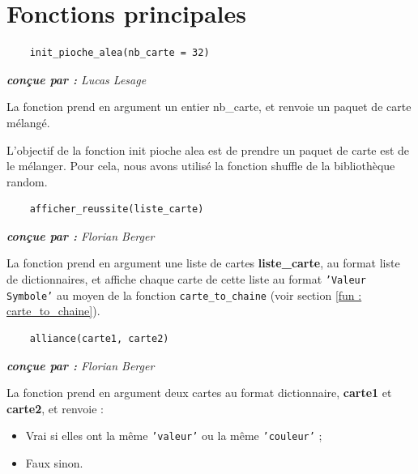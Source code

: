 \documentclass[titlepage]{article}
\begin{document}
\newpage \section{Fonctions principales}
\label{sec : principal}

\noindent	\begin{minipage}{\textwidth}
	\begin{lstlisting}
	init_pioche_alea(nb_carte = 32)
	\end{lstlisting}	
	\end{minipage}

\emph{\textbf{conçue par : } Lucas Lesage} \vspace{2mm}\par
La fonction prend en argument un entier nb\_carte, et renvoie un paquet de carte mélangé. \vspace{1mm}\par
L’objectif de la fonction init pioche alea est de prendre un paquet de carte est de le mélanger. Pour cela, nous avons utilisé la fonction shuffle de la bibliothèque random. \vspace{5mm}

\noindent	\begin{minipage}{\textwidth}
	\begin{lstlisting}
	afficher_reussite(liste_carte)
	\end{lstlisting}	
	\end{minipage}

\emph{\textbf{conçue par : } Florian Berger} \vspace{2mm}\par
La fonction prend en argument une liste de cartes \textbf{liste\_carte}, au format liste de dictionnaires, et affiche chaque carte de cette liste au format \texttt{'Valeur Symbole'} au moyen de la fonction \texttt{carte\_to\_chaine} (voir section \ref{fun : carte_to_chaine}).\par
\vspace{5mm}
	
\noindent	\begin{minipage}{\textwidth}
	\begin{lstlisting}
	alliance(carte1, carte2)
	\end{lstlisting}	
	\end{minipage}

\emph{\textbf{conçue par : } Florian Berger} \vspace{2mm}\par
La fonction prend en argument deux cartes au format dictionnaire,  \textbf{carte1} et \textbf{carte2}, et renvoie :
\begin{itemize}
\item Vrai si elles ont la même \texttt{'valeur'} ou la même \texttt{'couleur'} ;
\item Faux sinon.
\end{itemize}
\par
\vspace{5mm}
\end{document}
